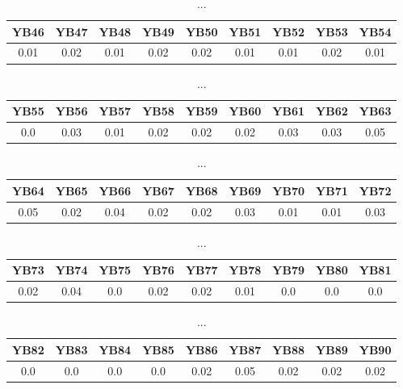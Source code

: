 \documentclass[]{article}
\begin{document}
\begin{table}[h]
      \centering
      \begin{tabular}{|c|c|c|c|c|c|c|c|c|}
            \hline
            YB46 & YB47 & YB48 & YB49 & YB50 & YB51 & YB52 & YB53 & YB54 \\
            \hline
            0.01 & 0.02 & 0.01 & 0.02 & 0.02 & 0.01 & 0.01 & 0.02 & 0.01 \\
            \hline
      \end{tabular}
      \caption{...}
\end{table}
\begin{table}[h]
      \centering
      \begin{tabular}{|c|c|c|c|c|c|c|c|c|}
            \hline
            YB55 & YB56 & YB57 & YB58 & YB59 & YB60 & YB61 & YB62 & YB63 \\
            \hline
            0.0  & 0.03 & 0.01 & 0.02 & 0.02 & 0.02 & 0.03 & 0.03 & 0.05 \\
            \hline
      \end{tabular}
      \caption{...}
\end{table}
\begin{table}[h]
      \centering
      \begin{tabular}{|c|c|c|c|c|c|c|c|c|}
            \hline
            YB64 & YB65 & YB66 & YB67 & YB68 & YB69 & YB70 & YB71 & YB72 \\
            \hline
            0.05 & 0.02 & 0.04 & 0.02 & 0.02 & 0.03 & 0.01 & 0.01 & 0.03 \\
            \hline
      \end{tabular}
      \caption{...}
\end{table}
\begin{table}[h]
      \centering
      \begin{tabular}{|c|c|c|c|c|c|c|c|c|}
            \hline
            YB73 & YB74 & YB75 & YB76 & YB77 & YB78 & YB79 & YB80 & YB81 \\
            \hline
            0.02 & 0.04 & 0.0  & 0.02 & 0.02 & 0.01 & 0.0  & 0.0  & 0.0  \\
            \hline
      \end{tabular}
      \caption{...}
\end{table}
\begin{table}[h]
      \centering
      \begin{tabular}{|c|c|c|c|c|c|c|c|c|}
            \hline
            YB82 & YB83 & YB84 & YB85 & YB86 & YB87 & YB88 & YB89 & YB90 \\
            \hline
            0.0  & 0.0  & 0.0  & 0.0  & 0.02 & 0.05 & 0.02 & 0.02 & 0.02 \\
            \hline
      \end{tabular}
      \caption{...}
\end{table}
\end{document}
